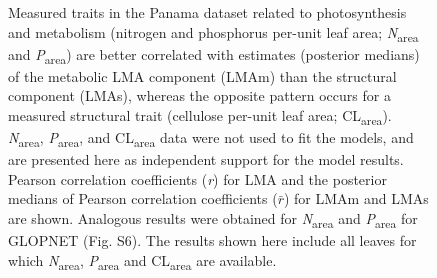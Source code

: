 \documentclass[
  12pt,
  letterpaper,
  DIV=11,
  numbers=noendperiod]{scrartcl}
\begin{document}
\begin{figure}


\caption{\label{fig-pa_npc}Measured traits in the Panama dataset related
to photosynthesis and metabolism (nitrogen and phosphorus per-unit leaf
area; \emph{N}\textsubscript{area} and \emph{P}\textsubscript{area}) are
better correlated with estimates (posterior medians) of the metabolic
LMA component (LMAm) than the structural component (LMAs), whereas the
opposite pattern occurs for a measured structural trait (cellulose
per-unit leaf area; CL\textsubscript{area}).
\emph{N}\textsubscript{area}, \emph{P}\textsubscript{area}, and
CL\textsubscript{area} data were not used to fit the models, and are
presented here as independent support for the model results. Pearson
correlation coefficients (\emph{r}) for LMA and the posterior medians of
Pearson correlation coefficients (\(\bar{r}\)) for LMAm and LMAs are
shown. Analogous results were obtained for \emph{N}\textsubscript{area}
and \emph{P}\textsubscript{area} for GLOPNET (Fig. S6). The results
shown here include all leaves for which \emph{N}\textsubscript{area},
\emph{P}\textsubscript{area} and CL\textsubscript{area} are available.}

\end{figure}%
\end{document}
